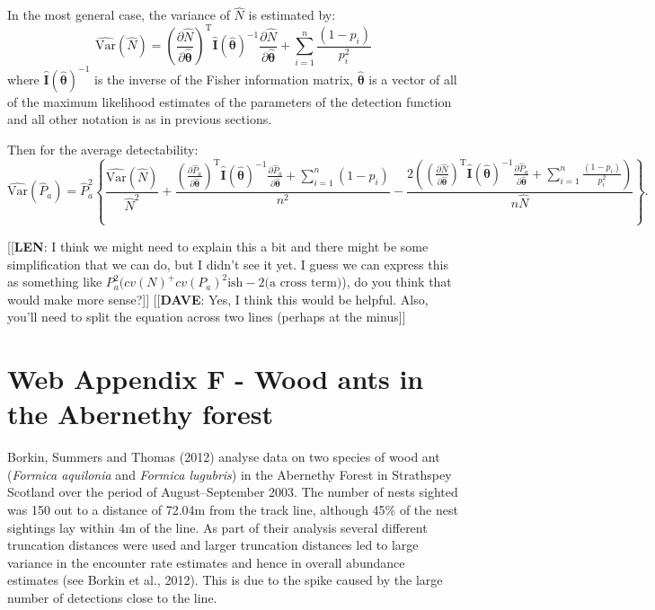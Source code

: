 \documentclass[useAMS,referee]{biom}
\begin{document}
In the most general case, the variance of $\hat{N}$ is estimated by:
\begin{equation*}
\hat{\text{Var}}\left( \hat{N} \right) = \left(\frac{\partial \hat{N}}{\partial\hat{\bm{\theta}}}\right)^\text{T}\hat{\mathbf{I}}(\hat{\bm{\theta}})^{-1}\frac{\partial \hat{N}}{\partial\hat{\bm{\theta}}} + \sum_{i=1}^n \frac{(1-p_i)}{p_i^2}
\end{equation*}
where $\hat{\mathbf{I}}(\hat{\bm{\theta}})^{-1}$ is the inverse of the Fisher information matrix,  $\hat{\bm{\theta}}$ is a vector of all of the maximum likelihood estimates of the parameters of the detection function and all other notation is as in previous sections.

Then for the average detectability:
\begin{equation*}
\hat{\text{Var}}\left( \hat{P}_a \right) = \hat{P}_a^2\left\{ \frac{\hat{\text{Var}}(\hat{N})}{\hat{N}^2} + \frac{\left(\frac{\partial \hat{P}_a}{\partial\bm{\hat{\theta}}}\right)^\text{T}\hat{\mathbf{I}}(\hat{\bm{\theta}})^{-1}\frac{\partial \hat{P}_a}{\partial\bm{\hat{\theta}}}+\sum_{i=1}^n (1-p_i)}{n^2}-\frac{2\left(\left(\frac{\partial \hat{N}}{\partial\bm{\hat{\theta}}}\right)^\text{T}\hat{\mathbf{I}}(\hat{\bm{\theta}})^{-1}\frac{\partial \hat{P}_a}{\partial\bm{\hat{\theta}}}+\sum_{i=1}^n\frac{(1-p_i)}{p_i^2}\right)}{n\hat{N}}\right\}.
\end{equation*}

[[\textbf{LEN}: I think we might need to explain this a bit and there might be some simplification that we can do, but I didn't see it yet. I guess we can express this as something like $P_a^2(cv(N)^+cv(P_a)^2\text{ish}-2\text{(a cross term)}$), do you think that would make more sense?]]
[[\textbf{DAVE}: Yes, I think this would be helpful.  Also, you'll need to split the equation across two lines (perhaps at the minus]] 


\section*{Web Appendix F - Wood ants in the Abernethy forest}

Borkin, Summers and Thomas (2012) analyse data on two species of wood ant (\textit{Formica aquilonia} and \textit{Formica lugubris}) in the Abernethy Forest in Strathspey Scotland over the period of August--September 2003. The number of nests sighted was 150 out to a distance of 72.04m from the track line, although 45\% of the nest sightings lay within 4m of the line. As part of their analysis several different truncation distances were used and larger truncation distances led to large variance in the encounter rate estimates and hence in overall abundance estimates (see Borkin et al., 2012). This is due to the spike caused by the large number of detections close to the line.
\end{document}

